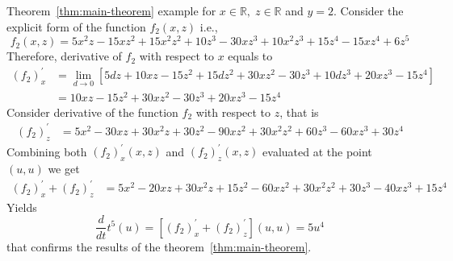 \begin{example}
    \normalfont
    Theorem~\ref{thm:main-theorem} example for $x\in\mathbb{R}, \; z\in \mathbb{R}$ and $y=2$.
    Consider the explicit form of the function $f_{2} (x, z)$ i.e.,
    \[
        f_2 (x, z) = 5 x^2 z - 15 x z^2 + 15 x^2 z^2 + 10 z^3 - 30 x z^3 + 10 x^2 z^3 + 15 z^4 - 15 x z^4 + 6 z^5
    \]
    Therefore, derivative of $f_{2}$ with respect to $x$ equals to
    \begin{align*}
    (f_2)
        ^{'}_{x} &= \lim_{d \to 0} \left[ 5 d z + 10 x z - 15 z^2 + 15 d z^2 + 30 x z^2 - 30 z^3 + 10 d z^3 +
        20 x z^3 - 15 z^4 \right] \\
        &= 10 x z - 15 z^2 + 30 x z^2 - 30 z^3 + 20 x z^3 - 15 z^4
    \end{align*}
    Consider derivative of the function $f_2$ with respect to $z$, that is
    \begin{align*}
    (f_2)
        ^{'}_{z}
        &= 5 x^2 - 30 x z + 30 x^2 z + 30 z^2 - 90 x z^2 + 30 x^2 z^2 + 60 z^3 - 60 x z^3 + 30 z^4
    \end{align*}
    Combining both $(f_2)^{'}_{x} (x, z)$ and $(f_2)^{'}_{z} (x, z)$ evaluated at the point $(u, u)$ we get
    \begin{align*}
    (f_2)
        ^{'}_{x} + (f_2)^{'}_{z} &= 5 x^2 - 20 x z + 30 x^2 z + 15 z^2 - 60 x z^2 + 30 x^2 z^2 + 30 z^3 - 40 x z^3 + 15 z^4
    \end{align*}
    Yields
    \begin{equation*}
        \frac{d}{dt} t^{5} (u) = [(f_2)^{'}_{x} + (f_2)^{'}_{z}] (u,u) = 5 u^4
    \end{equation*}
    that confirms the results of the theorem~\ref{thm:main-theorem}.
\end{example}